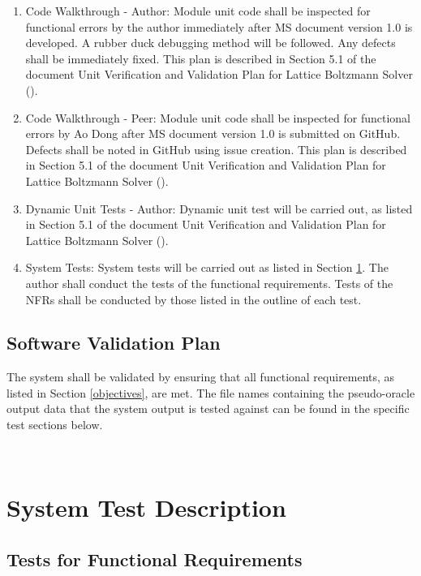\documentclass[12pt, titlepage]{article}
\begin{document}
\begin{enumerate}
\item Code Walkthrough - Author: Module unit code shall be inspected for functional errors by the author immediately after MS document version 1.0 is developed. A rubber duck debugging method will be followed. Any defects shall be immediately fixed. This plan is described in Section 5.1 of the document Unit Verification and Validation Plan for Lattice Boltzmann Solver (\citet{LBM_UVNV_PM}).
\item Code Walkthrough - Peer: Module unit code shall be inspected for functional errors by Ao Dong after MS document version 1.0 is submitted on GitHub. Defects shall be noted in GitHub using issue creation. This plan is described in Section 5.1 of the document Unit Verification and Validation Plan for Lattice Boltzmann Solver (\citet{LBM_UVNV_PM}).
\item Dynamic Unit Tests - Author: Dynamic unit test will be carried out, as listed in Section 5.1 of the document Unit Verification and Validation Plan for Lattice Boltzmann Solver (\citet{LBM_UVNV_PM}).
\item System Tests: System tests will be carried out as listed in Section \ref{systest}. The author shall conduct the tests of the functional requirements. Tests of the NFRs shall be conducted by those listed in the outline of each test.
\end{enumerate}



\subsection{Software Validation Plan}

The system shall be validated by ensuring that all functional requirements, as listed in Section \ref{objectives}, are met. The file names containing the pseudo-oracle output data that the system output is tested against can be found in the specific test sections below.


~\newpage	 


\section{System Test Description}

\label{systest}


\subsection{Tests for Functional Requirements}
\end{document}
